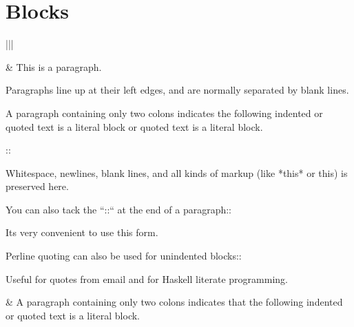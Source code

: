 \documentclass[letterpaper,10pt,english]{sphinxmanual}
\begin{document}
\section{Blocks}
\label{\detokenize{rst-cheatsheet/rst-cheatsheet:blocks}}

\begin{savenotes}\sphinxattablestart
\centering
\begin{tabular}[t]{|*{2}{|}}
\hline

\begin{sphinxVerbatimintable}[commandchars=\\\{\}]
   

        
    
\end{sphinxVerbatimintable}
&
This is a paragraph.

Paragraphs line up at their left
edges, and are normally separated
by blank lines.
\\
\hline
\begin{sphinxVerbatimintable}[commandchars=\\\{\}]
A paragraph containing only two colons indicates
the following indented or quoted text is a literal
block or quoted text is a literal block.

::

  Whitespace, newlines, blank lines, and  all kinds of
  markup (like *this* or \PYGZbs{}this) is preserved here.

You can also tack the ``::`` at the end of a
paragraph::

   It\PYGZsq{}s very convenient to use this form.

Per\PYGZhy{}line quoting can also be used for unindented
blocks::

\PYGZgt{} Useful for quotes from email and
\PYGZgt{} for Haskell literate programming.
\end{sphinxVerbatimintable}
&
A paragraph containing only two colons
indicates that the following indented
or quoted text is a literal block.

\begin{sphinxVerbatimintable}[commandchars=\\\{\}]
    
      
\PYGZbs{}     
\end{sphinxVerbatimintable}


\end{tabular}
\end{savenotes}
\end{document}
